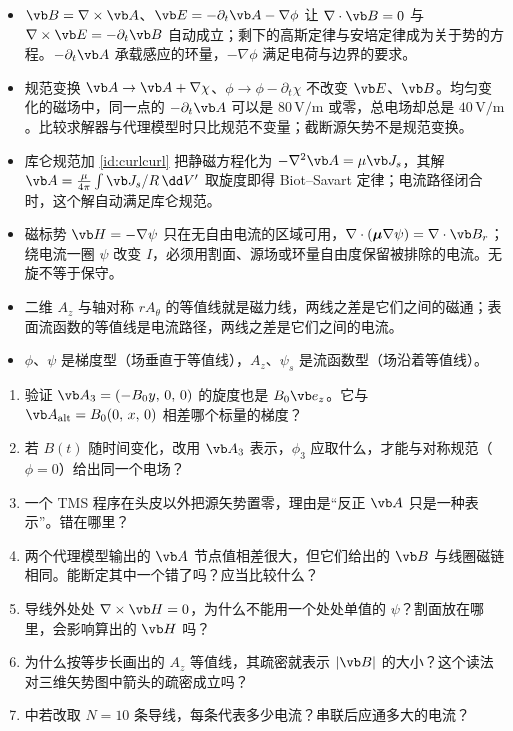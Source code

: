 \begin{takeaways}
\begin{itemize}
\item $\vb B=\nabla\times\vb A$、$\vb E=-\partial_t\vb A-\nabla\phi$ 让 $\nabla\cdot\vb B=0$ 与 $\nabla\times\vb E=-\partial_t\vb B$ 自动成立；剩下的高斯定律与安培定律成为关于势的方程。$-\partial_t\vb A$ 承载感应的环量，$-\nabla\phi$ 满足电荷与边界的要求。
\item 规范变换 $\vb A\to\vb A+\nabla\chi$、$\phi\to\phi-\partial_t\chi$ 不改变 $\vb E$、$\vb B$。均匀变化的磁场中，同一点的 $-\partial_t\vb A$ 可以是 $80\,\mathrm{V/m}$ 或零，总电场却总是 $40\,\mathrm{V/m}$。比较求解器与代理模型时只比规范不变量；截断源矢势不是规范变换。
\item 库仑规范加 \eqref{id:curlcurl} 把静磁方程化为 $-\nabla^2\vb A=\mu\vb J_s$，其解 $\vb A=\frac{\mu}{4\pi}\int\vb J_s/R\,\dd V'$ 取旋度即得 Biot–Savart 定律；电流路径闭合时，这个解自动满足库仑规范。
\item 磁标势 $\vb H=-\nabla\psi$ 只在无自由电流的区域可用，$\nabla\cdot(\boldsymbol\mu\nabla\psi)=\nabla\cdot\vb B_r$；绕电流一圈 $\psi$ 改变 $I$，必须用割面、源场或环量自由度保留被排除的电流。无旋不等于保守。
\item 二维 $A_z$ 与轴对称 $rA_\theta$ 的等值线就是磁力线，两线之差是它们之间的磁通；表面流函数的等值线是电流路径，两线之差是它们之间的电流。
\item $\phi$、$\psi$ 是梯度型（场垂直于等值线），$A_z$、$\psi_s$ 是流函数型（场沿着等值线）。
\end{itemize}
\end{takeaways}

\begin{selfcheck}
\begin{enumerate}
\item 验证 $\vb A_3=(-B_0y,\,0,\,0)$ 的旋度也是 $B_0\vb e_z$。它与 $\vb A_{\rm alt}=B_0(0,\,x,\,0)$ 相差哪个标量的梯度？
\item 若 $B(t)$ 随时间变化，改用 $\vb A_3$ 表示，$\phi_3$ 应取什么，才能与对称规范（$\phi=0$）给出同一个电场？
\item 一个 TMS 程序在头皮以外把源矢势置零，理由是“反正 $\vb A$ 只是一种表示”。错在哪里？
\item 两个代理模型输出的 $\vb A$ 节点值相差很大，但它们给出的 $\vb B$ 与线圈磁链相同。能断定其中一个错了吗？应当比较什么？
\item 导线外处处 $\nabla\times\vb H=0$，为什么不能用一个处处单值的 $\psi$？割面放在哪里，会影响算出的 $\vb H$ 吗？
\item 为什么按等步长画出的 $A_z$ 等值线，其疏密就表示 $|\vb B|$ 的大小？这个读法对三维矢势图中箭头的疏密成立吗？
\item {} 中若改取 $N=10$ 条导线，每条代表多少电流？串联后应通多大的电流？
\end{enumerate}
\end{selfcheck}


